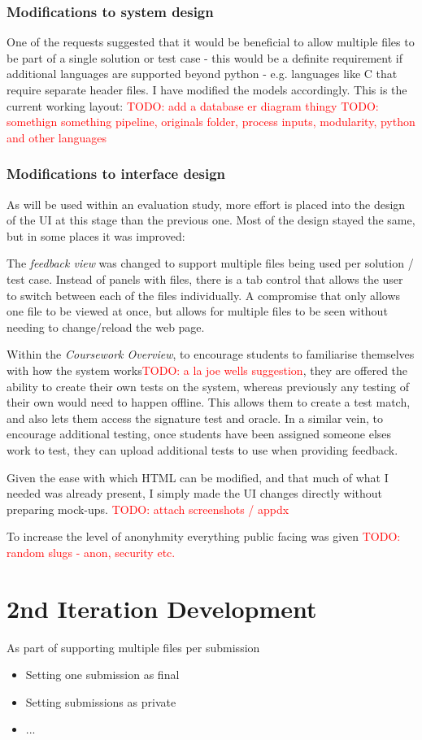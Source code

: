 \documentclass[a4paper,11pt]{report}
\newcommand{\todo}[1]{\textcolor{red}{TODO: #1}}
\begin{document}
\subsubsection{Modifications to system design}
One of the requests suggested that it would be beneficial to allow multiple files to be part of a single solution or test case - this would be a definite requirement if additional languages are supported beyond python - e.g. languages like C that require separate header files. I have modified the models accordingly. This is the current working layout:
\todo{add a database er diagram thingy}
\todo{somethign something pipeline, originals folder, process inputs, modularity, python and other languages}
\subsubsection{Modifications to interface design}
As will be used within an evaluation study, more effort is placed into the design of the UI at this stage than the previous one. Most of the design stayed the same, but in some places it was improved:\par
The \textit{feedback view} was changed to support multiple files being used per solution / test case. Instead of panels with files, there is a tab control that allows the user to switch between each of the files individually. A compromise that only allows one file to be viewed at once, but allows for multiple files to be seen without needing to change/reload the web page.\par
Within the \textit{Coursework Overview}, to encourage students to familiarise themselves with how the system works\todo{a la joe wells suggestion}, they are offered the ability to create their own tests on the system, whereas previously any testing of their own would need to happen offline. This allows them to create a test match, and also lets them access the signature test and oracle. In a similar vein, to encourage additional testing, once students have been assigned someone elses work to test, they can upload additional tests to use when providing feedback.\par
Given the ease with which HTML can be modified, and that much of what I needed was already present, I simply made the UI changes directly without preparing mock-ups. \todo{attach screenshots / appdx}\par
To increase the level of anonyhmity everything public facing was given \todo{random slugs - anon, security etc.}
\section{2nd Iteration Development}
As part of supporting multiple files per submission
\begin{itemize}
\item Setting one submission as final
\item Setting submissions as private
\item ...
\end{itemize}
\end{document}
